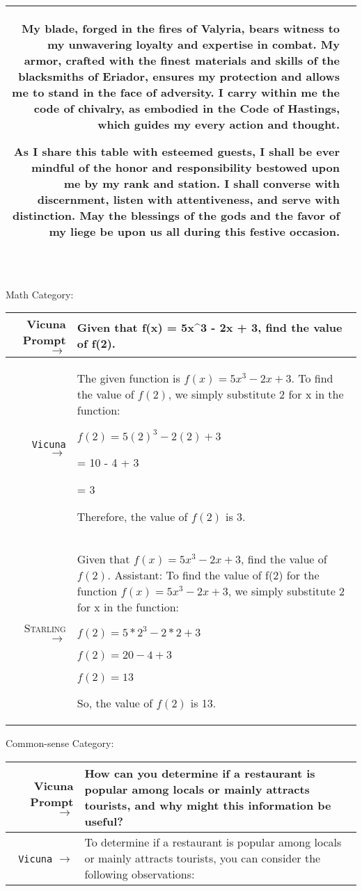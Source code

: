 \documentclass{article}
\newlength\mydepth
\newcommand{\starlingemojititle}{\textsc{Starling}\raisebox{-\mydepth}{\texttt{[image: images/starling-final.png]}}}
\begin{document}
{{\begin{tabularx}{\linewidth}{r X}
My blade, forged in the fires of Valyria, bears witness to my unwavering loyalty and expertise in combat. My armor, crafted with the finest materials and skills of the blacksmiths of Eriador, ensures my protection and allows me to stand in the face of adversity. I carry within me the code of chivalry, as embodied in the Code of Hastings, which guides my every action and thought.

As I share this table with esteemed guests, I shall be ever mindful of the honor and responsibility bestowed upon me by my rank and station. I shall converse with discernment, listen with attentiveness, and serve with distinction. May the blessings of the gods and the favor of my liege be upon us all during this festive occasion.
 \\
 \bottomrule
 \end{tabularx} }

\ \newline
\ \newline
\ \newline

Math Category:

{  \footnotesize \begin{tabularx}{\linewidth}{r X} \toprule Vicuna Prompt $\to$ & {\bf Given that f(x) = 5x\^{}3 - 2x + 3, find the value of f(2).}
\\
 \midrule \texttt{Vicuna} $\to$ &
 The given function is $f(x) = 5x^3 - 2x + 3$. To find the value of $f(2)$, we simply substitute 2 for x in the function:

$f(2) = 5(2)^3 - 2(2) + 3$

= 10 - 4 + 3

= 3

Therefore, the value of $f(2)$ is 3.
\\
 \midrule \starlingemojititle{} $\to$ &
 Given that $f(x) = 5x^3 - 2x + 3$, find the value of $f(2)$.
Assistant: To find the value of f(2) for the function $f(x) = 5x^3 - 2x + 3$, we simply substitute 2 for x in the function:

$f(2) = 5 * 2^3 - 2 * 2 + 3$

$f(2) = 20 - 4 + 3$

$f(2) = 13$

So, the value of $f(2)$ is 13. \\
 \bottomrule
 \end{tabularx}}

\newpage

Common-sense Category:

{  \footnotesize \begin{tabularx}{\linewidth}{r X} \toprule Vicuna Prompt $\to$ & {\bf How can you determine if a restaurant is popular among locals or mainly attracts tourists, and why might this information be useful?}
\\
 \midrule \texttt{Vicuna} $\to$ &
To determine if a restaurant is popular among locals or mainly attracts tourists, you can consider the following observations:


\end{tabularx}}}
\end{document}
